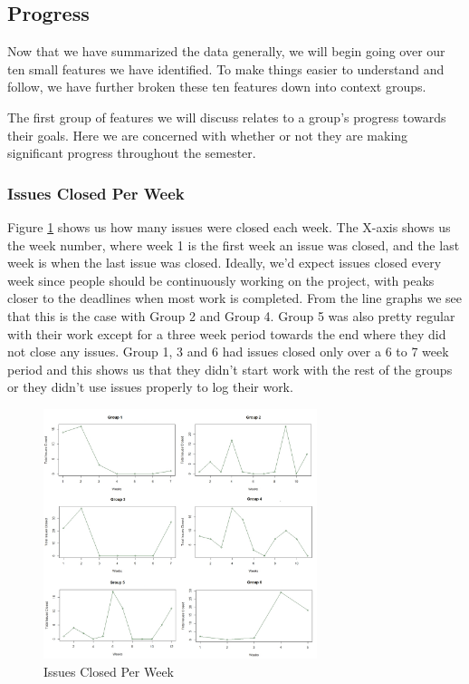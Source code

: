 \documentclass{acm_proc_article-sp}
\begin{document}
\subsection{Progress}

Now that we have summarized the data generally, we will begin going over our ten small features we have identified. To make things easier to understand and follow, we have further broken these ten features down into context groups.

The first group of features we will discuss relates to a group's progress towards their goals. Here we are concerned with whether or not they are making significant progress throughout the semester.

\subsubsection{Issues Closed Per Week}
Figure \ref{fig:closedPerWeek} shows us how many issues were closed each week. The X-axis shows us the week number, where week 1 is the first week an issue was closed, and the last week is when the last issue was closed. Ideally, we'd expect issues closed every week since people should be continuously working on the project, with peaks closer to the deadlines when most work is completed. From the line graphs we see that this is the case with Group 2 and Group 4. Group 5 was also pretty regular with their work except for a three week period towards the end where they did not close any issues. Group 1, 3 and 6 had issues closed only over a 6 to 7 week period and this shows us that they didn't start work with the rest of the groups or they didn't use issues properly to log their work.

\begin{figure}[h]
\centering
\includegraphics[width=8cm]{img/closedPerWeek}
\caption{Issues Closed Per Week}
\label{fig:closedPerWeek}
\end{figure}
\end{document}
